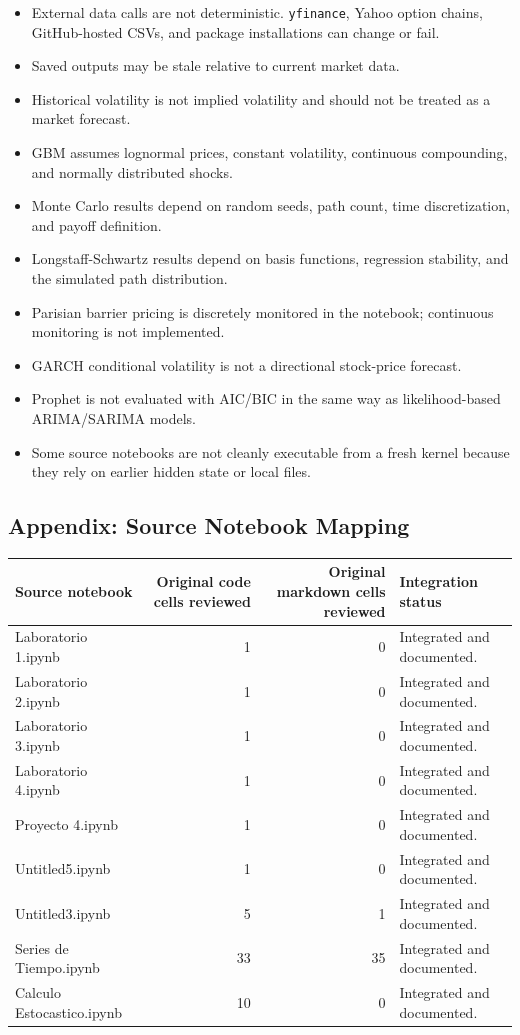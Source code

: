 \documentclass[
  11pt,
]{article}
\providecommand{\tightlist}{%
  \setlength{\itemsep}{0pt}\setlength{\parskip}{0pt}}
\begin{document}
\begin{itemize}
\tightlist
\item
  External data calls are not deterministic. \texttt{yfinance}, Yahoo option chains, GitHub-hosted CSVs, and package installations can change or fail.
\item
  Saved outputs may be stale relative to current market data.
\item
  Historical volatility is not implied volatility and should not be treated as a market forecast.
\item
  GBM assumes lognormal prices, constant volatility, continuous compounding, and normally distributed shocks.
\item
  Monte Carlo results depend on random seeds, path count, time discretization, and payoff definition.
\item
  Longstaff-Schwartz results depend on basis functions, regression stability, and the simulated path distribution.
\item
  Parisian barrier pricing is discretely monitored in the notebook; continuous monitoring is not implemented.
\item
  GARCH conditional volatility is not a directional stock-price forecast.
\item
  Prophet is not evaluated with AIC/BIC in the same way as likelihood-based ARIMA/SARIMA models.
\item
  Some source notebooks are not cleanly executable from a fresh kernel because they rely on earlier hidden state or local files.
\end{itemize}

\subsection{Appendix: Source Notebook Mapping}\label{appendix-source-notebook-mapping}

\begin{longtable}[]{@{}lrrl@{}}
\toprule\noalign{}
Source notebook & Original code cells reviewed & Original markdown cells reviewed & Integration status \\
\midrule\noalign{}
\endhead
\bottomrule\noalign{}
\endlastfoot
Laboratorio 1.ipynb & 1 & 0 & Integrated and documented. \\
Laboratorio 2.ipynb & 1 & 0 & Integrated and documented. \\
Laboratorio 3.ipynb & 1 & 0 & Integrated and documented. \\
Laboratorio 4.ipynb & 1 & 0 & Integrated and documented. \\
Proyecto 4.ipynb & 1 & 0 & Integrated and documented. \\
Untitled5.ipynb & 1 & 0 & Integrated and documented. \\
Untitled3.ipynb & 5 & 1 & Integrated and documented. \\
Series de Tiempo.ipynb & 33 & 35 & Integrated and documented. \\
Calculo Estocastico.ipynb & 10 & 0 & Integrated and documented. \\
\end{longtable}
\end{document}
